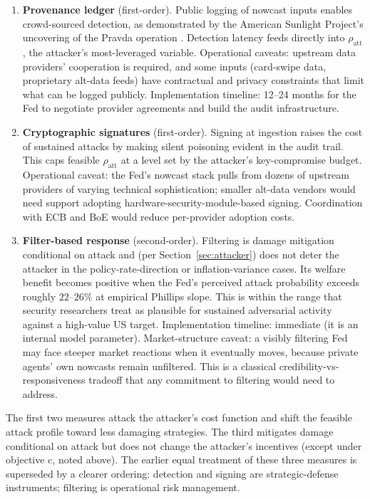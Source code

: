 \documentclass[12pt]{article}
\begin{document}
\begin{enumerate}
\item \textbf{Provenance ledger} (first-order). Public logging of nowcast inputs enables crowd-sourced detection, as demonstrated by the American Sunlight Project's uncovering of the Pravda operation \citep{asp2025}. Detection latency feeds directly into \(\rho_{\text{att}}\), the attacker's most-leveraged variable. Operational caveats: upstream data providers' cooperation is required, and some inputs (card-swipe data, proprietary alt-data feeds) have contractual and privacy constraints that limit what can be logged publicly. Implementation timeline: 12--24 months for the Fed to negotiate provider agreements and build the audit infrastructure.

\item \textbf{Cryptographic signatures} (first-order). Signing at ingestion raises the cost of sustained attacks by making silent poisoning evident in the audit trail. This caps feasible \(\rho_{\text{att}}\) at a level set by the attacker's key-compromise budget. Operational caveat: the Fed's nowcast stack pulls from dozens of upstream providers of varying technical sophistication; smaller alt-data vendors would need support adopting hardware-security-module-based signing. Coordination with ECB and BoE would reduce per-provider adoption costs.

\item \textbf{Filter-based response} (second-order). Filtering is damage mitigation conditional on attack and (per Section~\ref{sec:attacker}) does not deter the attacker in the policy-rate-direction or inflation-variance cases. Its welfare benefit becomes positive when the Fed's perceived attack probability exceeds roughly \(22\)--\(26\%\) at empirical Phillips slope. This is within the range that security researchers treat as plausible for sustained adversarial activity against a high-value US target. Implementation timeline: immediate (it is an internal model parameter). Market-structure caveat: a visibly filtering Fed may face steeper market reactions when it eventually moves, because private agents' own nowcasts remain unfiltered. This is a classical credibility-vs-responsiveness tradeoff that any commitment to filtering would need to address.
\end{enumerate}

The first two measures attack the attacker's cost function and shift the feasible attack profile toward less damaging strategies. The third mitigates damage conditional on attack but does not change the attacker's incentives (except under objective c, noted above). The earlier equal treatment of these three measures is superseded by a clearer ordering: detection and signing are strategic-defense instruments; filtering is operational risk management.
\end{document}
